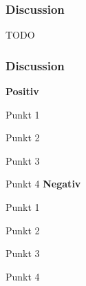 \begin{frame}
    \frametitle{Discussion}
 TODO
\end{frame}
\clearpage

\begin{frame}
    \frametitle{Discussion}

\begin{multicols}{2}
    \textbf{Positiv}

    Punkt 1

    Punkt 2

    Punkt 3

    Punkt 4
    \vfill\columnbreak
    \textbf{Negativ}

    Punkt 1

    Punkt 2

    Punkt 3

    Punkt 4
\end{multicols}
    
\end{frame}
\clearpage